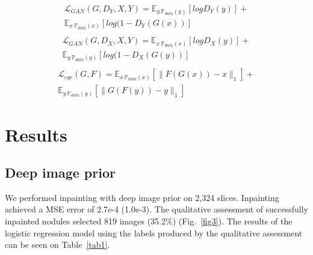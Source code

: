 \documentclass[runningheads]{llncs}
\begin{document}
\begin{equation}
\begin{aligned}
\mathcal{L}_{GAN}(G, D_Y, X, Y) = \mathbb{E}_{y~\mathbb{P}_{data}(y)} [log D_Y(y)] + \\
\mathbb{E}_{x~\mathbb{P}_{data}(x)} [log(1 - D_Y(G(x))]\\
\end{aligned}
\end{equation}
\begin{equation}
\begin{aligned}
\mathcal{L}_{GAN}(G, D_X, X, Y) = \mathbb{E}_{x~\mathbb{P}_{data}(x)} [log D_X(y)] + \\
\mathbb{E}_{y~\mathbb{P}_{data}(y)} [log(1 - D_X(G(y))]\\
\end{aligned}
\end{equation}
\begin{equation}
\begin{aligned}
\mathcal{L}_{cyc}(G, F) = \mathbb{E}_{x~\mathbb{P}_{data}(x)} [\|F(G(x)) - x\|_1] + \\
\mathbb{E}_{y~\mathbb{P}_{data}(y)} [\|G(F(y)) - y\|_1]
\end{aligned}
\end{equation}

\section{Results}
\subsection{Deep image prior}
We performed inpainting with deep image prior on 2,324 slices. Inpainting achieved a MSE error of 2.7e-4 (1.0e-3). The qualitative assessment of successfully inpainted nodules selected 819 images (35.2\%) (Fig.~\ref{fig3}). The results of the logistic regression model using the labels produced by the qualitative assessment can be seen on Table~\ref{tab1}.
\end{document}
